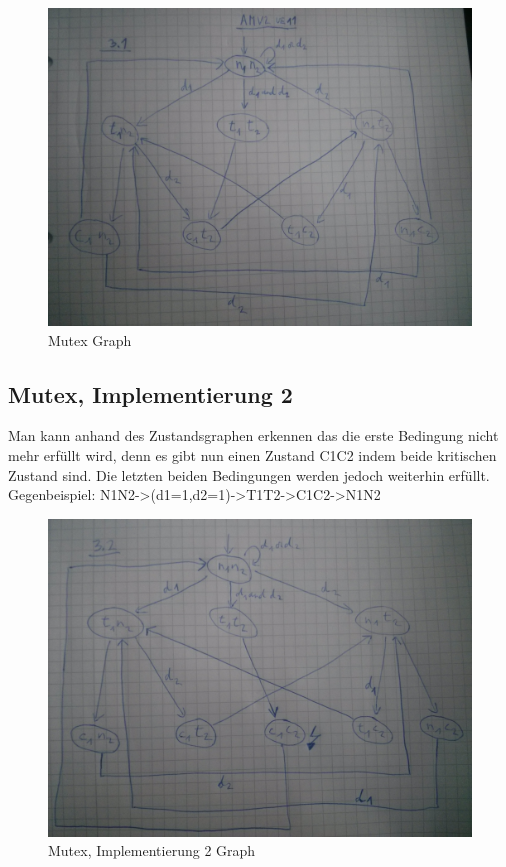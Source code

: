 \documentclass[12pt,a4paper]{article}
\begin{document}
\begin{figure}[!htb]%
\centering
\includegraphics[width=\textwidth]{3_1}%
\caption{Mutex Graph}%
\label{}%
\end{figure}

\subsection{Mutex, Implementierung 2}
Man kann anhand des Zustandsgraphen erkennen das die erste Bedingung nicht mehr erfüllt wird, denn es gibt nun einen Zustand C1C2 indem beide kritischen Zustand sind. Die letzten beiden Bedingungen werden jedoch weiterhin erfüllt. \\
Gegenbeispiel: N1N2->(d1=1,d2=1)->T1T2->C1C2->N1N2

\begin{figure}[!htb]%
\centering
\includegraphics[width=\textwidth]{3_2}%
\caption{Mutex, Implementierung 2 Graph}%
\label{}%
\end{figure}
\end{document}
